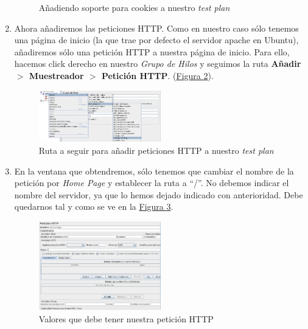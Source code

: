 \documentclass[10pt,a4paper,spanish]{article}
\numberwithin{equation}{section} %
\numberwithin{figure}{section} %
\numberwithin{table}{section} %
\begin{document}
\begin{enumerate}[1.]
\begin{figure}[H]
{        
        }
        \caption{Añadiendo soporte para cookies a nuestro \textit{test plan}}
        \label{galletas}
    \end{figure}   

    \item Ahora añadiremos las peticiones HTTP. Como en nuestro caso sólo tenemos una página de inicio (la que trae por defecto el servidor apache en Ubuntu), añadiremos sólo una petición HTTP a nuestra página de inicio. Para ello, hacemos click derecho en nuestro \textit{Grupo de Hilos} y seguimos la ruta \textbf{Añadir $>$ Muestreador $>$ Petición HTTP}. (\hyperref[rutapethtt]{Figura \ref*{rutapethtt}}).

    \begin{figure}[!h]
        \centering
        \includegraphics[width=0.5\textwidth]{16}
        \caption{Ruta a seguir para añadir peticiones HTTP a nuestro \textit{test plan}}
        \label{rutapethtt}
    \end{figure}

    \item En la ventana que obtendremos, sólo tenemos que cambiar el nombre de la petición por \textit{Home Page} y establecer la ruta a ``/''. No debemos indicar el nombre del servidor, ya que lo hemos dejado indicado con anterioridad. Debe quedarnos tal y como se ve en la \hyperref[valpethttp]{Figura \ref*{valpethttp}}.

    \begin{figure}[!h]
        \centering
        \includegraphics[width=0.5\textwidth]{17}
        \caption{Valores que debe tener nuestra petición HTTP}
        \label{valpethttp}
    \end{figure}


\end{enumerate}
\end{document}
